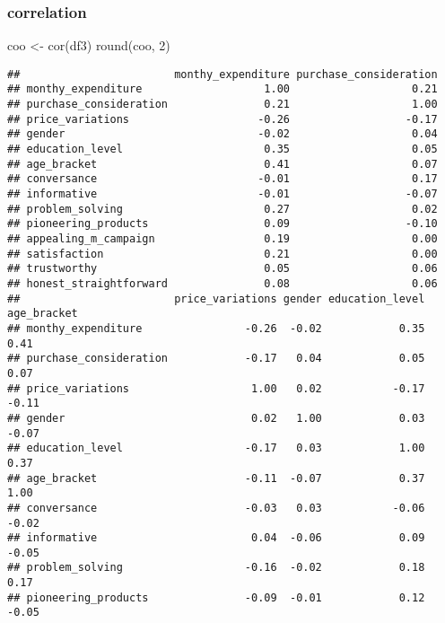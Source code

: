 \documentclass[
]{article}
\newenvironment{Shaded}{\begin{snugshade}}{\end{snugshade}}
\newcommand{\DecValTok}[1]{\textcolor[rgb]{0.00,0.00,0.81}{#1}}
\newcommand{\FunctionTok}[1]{\textcolor[rgb]{0.00,0.00,0.00}{#1}}
\newcommand{\NormalTok}[1]{#1}
\newcommand{\OtherTok}[1]{\textcolor[rgb]{0.56,0.35,0.01}{#1}}
\begin{document}
\hypertarget{correlation}{%
\subsubsection{correlation}\label{correlation}}

\begin{Shaded}
\begin{Highlighting}[]
\NormalTok{coo }\OtherTok{\textless{}{-}} \FunctionTok{cor}\NormalTok{(df3)}
\FunctionTok{round}\NormalTok{(coo, }\DecValTok{2}\NormalTok{)}
\end{Highlighting}
\end{Shaded}

\begin{verbatim}
##                        monthy_expenditure purchase_consideration
## monthy_expenditure                   1.00                   0.21
## purchase_consideration               0.21                   1.00
## price_variations                    -0.26                  -0.17
## gender                              -0.02                   0.04
## education_level                      0.35                   0.05
## age_bracket                          0.41                   0.07
## conversance                         -0.01                   0.17
## informative                         -0.01                  -0.07
## problem_solving                      0.27                   0.02
## pioneering_products                  0.09                  -0.10
## appealing_m_campaign                 0.19                   0.00
## satisfaction                         0.21                   0.00
## trustworthy                          0.05                   0.06
## honest_straightforward               0.08                   0.06
##                        price_variations gender education_level age_bracket
## monthy_expenditure                -0.26  -0.02            0.35        0.41
## purchase_consideration            -0.17   0.04            0.05        0.07
## price_variations                   1.00   0.02           -0.17       -0.11
## gender                             0.02   1.00            0.03       -0.07
## education_level                   -0.17   0.03            1.00        0.37
## age_bracket                       -0.11  -0.07            0.37        1.00
## conversance                       -0.03   0.03           -0.06       -0.02
## informative                        0.04  -0.06            0.09       -0.05
## problem_solving                   -0.16  -0.02            0.18        0.17
## pioneering_products               -0.09  -0.01            0.12       -0.05

\end{verbatim}
\end{document}
